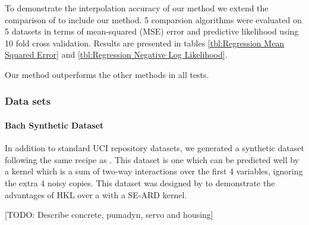 \documentclass[twoside]{article}
\begin{document}
To demonstrate the interpolation accuracy of our method we extend the comparison of \cite{duvenaud2011additive11} to include our method.
5 comparsion algorithms were evaluated on 5 datasets in terms of mean-squared (MSE) error and predictive likelihood using 10 fold cross validation.
Results are presented in tables \ref{tbl:Regression Mean Squared Error} and \ref{tbl:Regression Negative Log Likelihood}.
%


%
Our method outperforms the other methods in all tests.


\subsubsection{Data sets}


\paragraph{Bach Synthetic Dataset}
In addition to standard UCI repository datasets, we generated a synthetic dataset following the same recipe as \cite{DBLP:journals/corr/abs-0909-0844}.
This dataset is one which can be predicted well by a kernel which is a sum of two-way interactions over the first 4 variables, ignoring the extra 4 noisy copies.
%
This dataset was designed by \cite{DBLP:journals/corr/abs-0909-0844} to demonstrate the advantages of HKL over a \gp{} with a SE-ARD kernel. 


[TODO: Describe concrete, pumadyn, servo and housing]
\end{document}
